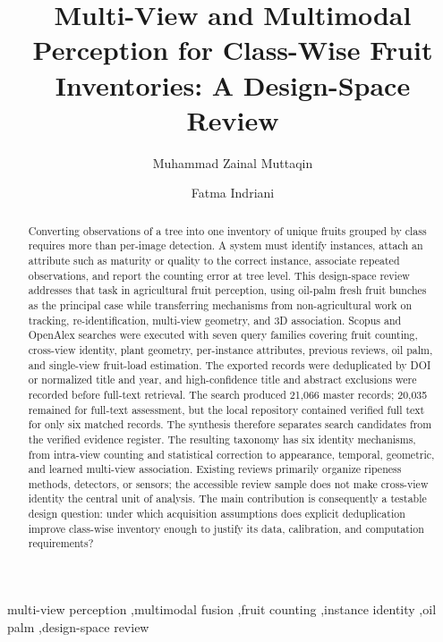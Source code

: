 \documentclass[review]{elsarticle}
\begin{document}
\begin{frontmatter}
\title{Multi-View and Multimodal Perception for Class-Wise Fruit Inventories: A Design-Space Review}
\author[a]{Muhammad Zainal Muttaqin}
\author[a]{Fatma Indriani}
\begin{abstract}
Converting observations of a tree into one inventory of unique fruits grouped by class requires more than per-image detection. A system must identify instances, attach an attribute such as maturity or quality to the correct instance, associate repeated observations, and report the counting error at tree level. This design-space review addresses that task in agricultural fruit perception, using oil-palm fresh fruit bunches as the principal case while transferring mechanisms from non-agricultural work on tracking, re-identification, multi-view geometry, and 3D association. Scopus and OpenAlex searches were executed with seven query families covering fruit counting, cross-view identity, plant geometry, per-instance attributes, previous reviews, oil palm, and single-view fruit-load estimation. The exported records were deduplicated by DOI or normalized title and year, and high-confidence title and abstract exclusions were recorded before full-text retrieval. The search produced 21,066 master records; 20,035 remained for full-text assessment, but the local repository contained verified full text for only six matched records. The synthesis therefore separates search candidates from the verified evidence register. The resulting taxonomy has six identity mechanisms, from intra-view counting and statistical correction to appearance, temporal, geometric, and learned multi-view association. Existing reviews primarily organize ripeness methods, detectors, or sensors; the accessible review sample does not make cross-view identity the central unit of analysis. The main contribution is consequently a testable design question: under which acquisition assumptions does explicit deduplication improve class-wise inventory enough to justify its data, calibration, and computation requirements?
\end{abstract}
\begin{keyword}
multi-view perception \sep multimodal fusion \sep fruit counting \sep instance identity \sep oil palm \sep design-space review
\end{keyword}
\end{frontmatter}





\end{document}
